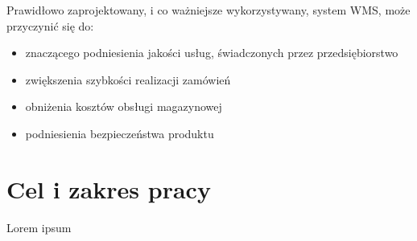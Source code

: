 	
	Prawidłowo zaprojektowany, i co ważniejsze wykorzystywany, system WMS, może przyczynić się do:
	\begin{itemize}
		\item znaczącego podniesienia jakości usług, świadczonych przez przedsiębiorstwo
		\item zwiększenia szybkości realizacji zamówień
		\item obniżenia kosztów obsługi magazynowej
		\item podniesienia bezpieczeństwa produktu
	\end{itemize}

\section{Cel i zakres pracy}

Lorem ipsum
